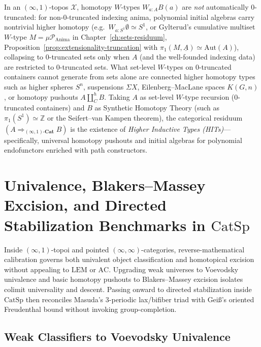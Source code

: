 \documentclass[10pt,twoside,openright]{book}
\theoremstyle{crmplain}
\theoremstyle{crmdef}
\theoremstyle{crmremark}
\begin{document}
In an $(\infty, 1)$-topos $\mathcal{X}$, homotopy $W$-types $W_{a:A} B(a)$ are \emph{not} automatically $0$-truncated: for non-$0$-truncated indexing anima, polynomial initial algebras carry nontrivial higher homotopy (e.g.\ $W_{a:S^1} \emptyset \simeq S^1$, or Gylterud's cumulative multiset $W$-type $M = \mu\mathcal{P}_{\mathrm{Anima}}$ in Chapter~\ref{ch:sets-residuum}, Proposition~\ref{prop:extensionality-truncation} with $\pi_1(M, \underline{A}) \simeq \mathrm{Aut}(A)$), collapsing to $0$-truncated sets only when $A$ (and the well-founded indexing data) are restricted to $0$-truncated sets. What set-level $W$-types on $0$-truncated containers cannot generate from sets alone are connected higher homotopy types such as higher spheres $S^n$, suspensions $\Sigma X$, Eilenberg--MacLane spaces $K(G, n)$, or homotopy pushouts $A \amalg^h_C B$. Taking $A$ as set-level $W$-type recursion ($0$-truncated containers) and $B$ as Synthetic Homotopy Theory (such as $\pi_1(S^1) \simeq \mathbb{Z}$ or the Seifert--van Kampen theorem), the categorical residuum $(A \Rightarrow_{(\infty,1)\text{-}\mathbf{Cat}} B)$ is the existence of \emph{Higher Inductive Types (HITs)}---specifically, universal homotopy pushouts and initial algebras for polynomial endofunctors enriched with path constructors.

\section{\texorpdfstring{Univalence, Blakers--Massey Excision, and Directed Stabilization Benchmarks in $\mathrm{CatSp}$}{Univalence, Blakers-Massey Excision, and Directed Stabilization Benchmarks in CatSp}}\label{subsec:excision-catsp}

Inside $(\infty, 1)$-topoi and pointed $(\infty, \infty)$-categories, reverse-mathematical calibration governs both univalent object classification and homotopical excision without appealing to $\mathrm{LEM}$ or $\mathrm{AC}$. Upgrading weak universes to Voevodsky univalence and basic homotopy pushouts to Blakers--Massey excision isolates colimit universality and descent. Passing onward to directed stabilization inside $\mathrm{CatSp}$ then reconciles Masuda's 3-periodic lax/bifiber triad with Gei\ss's oriented Freudenthal bound without invoking group-completion.

\subsection{Weak Classifiers to Voevodsky Univalence}
\end{document}
